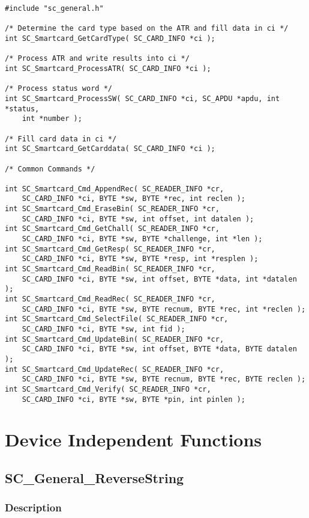 \documentclass[a4paper,oneside]{article}
\begin{document}
\begin{verbatim}
#include "sc_general.h"

/* Determine the card type based on the ATR and fill data in ci */
int SC_Smartcard_GetCardType( SC_CARD_INFO *ci );

/* Process ATR and write results into ci */
int SC_Smartcard_ProcessATR( SC_CARD_INFO *ci );

/* Process status word */
int SC_Smartcard_ProcessSW( SC_CARD_INFO *ci, SC_APDU *apdu, int *status,
	int *number );

/* Fill card data in ci */
int SC_Smartcard_GetCarddata( SC_CARD_INFO *ci );

/* Common Commands */

int SC_Smartcard_Cmd_AppendRec( SC_READER_INFO *cr,
	SC_CARD_INFO *ci, BYTE *sw, BYTE *rec, int reclen );
int SC_Smartcard_Cmd_EraseBin( SC_READER_INFO *cr,
	SC_CARD_INFO *ci, BYTE *sw, int offset, int datalen );
int SC_Smartcard_Cmd_GetChall( SC_READER_INFO *cr,
	SC_CARD_INFO *ci, BYTE *sw, BYTE *challenge, int *len );
int SC_Smartcard_Cmd_GetResp( SC_READER_INFO *cr,
	SC_CARD_INFO *ci, BYTE *sw, BYTE *resp, int *resplen );
int SC_Smartcard_Cmd_ReadBin( SC_READER_INFO *cr,
	SC_CARD_INFO *ci, BYTE *sw, int offset, BYTE *data, int *datalen );
int SC_Smartcard_Cmd_ReadRec( SC_READER_INFO *cr,
	SC_CARD_INFO *ci, BYTE *sw, BYTE recnum, BYTE *rec, int *reclen );
int SC_Smartcard_Cmd_SelectFile( SC_READER_INFO *cr,
	SC_CARD_INFO *ci, BYTE *sw, int fid );
int SC_Smartcard_Cmd_UpdateBin( SC_READER_INFO *cr,
	SC_CARD_INFO *ci, BYTE *sw, int offset, BYTE *data, BYTE datalen );
int SC_Smartcard_Cmd_UpdateRec( SC_READER_INFO *cr,
	SC_CARD_INFO *ci, BYTE *sw, BYTE recnum, BYTE *rec, BYTE reclen );
int SC_Smartcard_Cmd_Verify( SC_READER_INFO *cr,
	SC_CARD_INFO *ci, BYTE *sw, BYTE *pin, int pinlen );
\end{verbatim}


\section{Device Independent Functions}

\subsection{SC\_General\_ReverseString}

\subsubsection*{Description}
\end{document}
